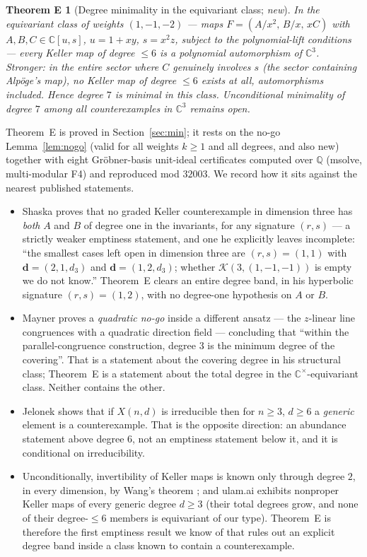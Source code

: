 \documentclass[11pt]{amsart}
\newcommand{\CC}{\mathbb{C}}
\newcommand{\QQ}{\mathbb{Q}}
\newcommand{\Cstar}{\CC^{\times}}
\theoremstyle{plain}
\newtheorem*{thmE}{Theorem E}
\theoremstyle{definition}
\theoremstyle{remark}
\begin{document}
\begin{thmE}[Degree minimality in the equivariant class; \emph{new}]
In the equivariant class of weights $(1,-1,-2)$ --- maps
$F=(A/x^{2},\,B/x,\,xC)$ with $A,B,C\in\CC[u,s]$, $u=1+xy$, $s=x^{2}z$,
subject to the polynomial-lift conditions --- every Keller map of degree
$\le6$ is a polynomial automorphism of $\CC^{3}$. Stronger: in the entire
sector where $C$ genuinely involves $s$ (the sector containing Alp\"oge's
map), no Keller map of degree $\le6$ exists at all, automorphisms
included. Hence degree $7$ is minimal in this class. Unconditional
minimality of degree $7$ among all counterexamples in $\CC^{3}$ remains
open.
\end{thmE}

Theorem~E is proved in Section~\ref{sec:min}; it rests on the no-go
Lemma~\ref{lem:nogo} (valid for all weights $k\ge1$ and all degrees, and
also new) together with eight Gr\"obner-basis unit-ideal certificates
computed over $\QQ$ (msolve, multi-modular F4) and reproduced mod
$32003$. We record how it sits against the nearest published statements.

\begin{itemize}
\item Shaska \cite[Thm.~10.10]{Shaska26} proves that no graded Keller
counterexample in dimension three has \emph{both} $A$ and $B$ of degree
one in the invariants, for any signature $(r,s)$ --- a strictly weaker
emptiness statement, and one he explicitly leaves incomplete: ``the
smallest cases left open in dimension three are $(r,s)=(1,1)$ with
$\mathbf d=(2,1,d_{3})$ and $\mathbf d=(1,2,d_{3})$; whether
$\mathcal K(3,(1,-1,-1))$ is empty we do not know.'' Theorem~E clears an
entire degree band, in his hyperbolic signature $(r,s)=(1,2)$, with no
degree-one hypothesis on $A$ or $B$.
\item Mayner \cite[\S7]{Mayner26} proves a \emph{quadratic no-go} inside a
different ansatz --- the $z$-linear line congruences with a quadratic
direction field --- concluding that ``within the parallel-congruence
construction, degree $3$ is the minimum degree of the covering''. That is
a statement about the covering degree in his structural class; Theorem~E
is a statement about the total degree in the $\Cstar$-equivariant class.
Neither contains the other.
\item Jelonek \cite{Jelonek26} shows that if $X(n,d)$ is irreducible then
for $n\ge3$, $d\ge6$ a \emph{generic} element is a counterexample. That
is the opposite direction: an abundance statement above degree $6$, not an
emptiness statement below it, and it is conditional on irreducibility.
\item Unconditionally, invertibility of Keller maps is known only through
degree $2$, in every dimension, by Wang's theorem \cite{Wang80}; and
ulam.ai \cite[Cor.~5.3]{Ulam26} exhibits nonproper Keller maps of every
generic degree $d\ge3$ (their total degrees grow, and none of their
degree-$\le6$ members is equivariant of our type). Theorem~E is therefore
the first emptiness result we know of that rules out an explicit degree
band inside a class known to contain a counterexample.
\end{itemize}
\end{document}
